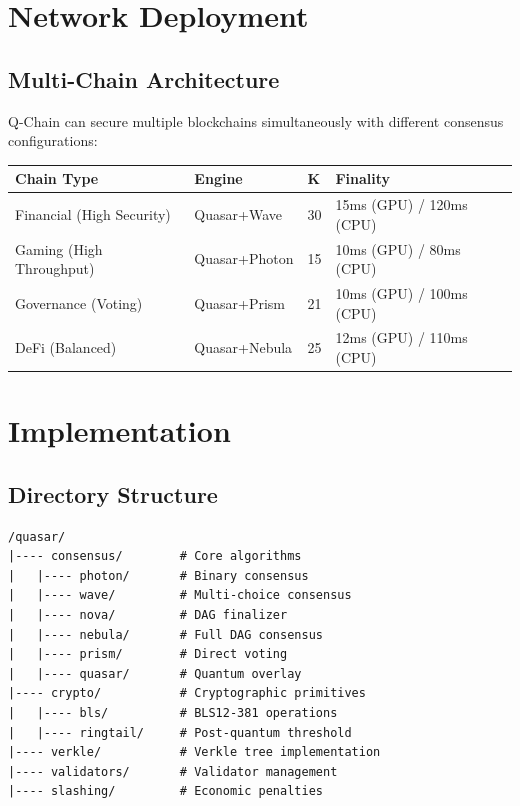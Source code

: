 \documentclass[11pt]{article}
\begin{document}
\section{Network Deployment}

\subsection{Multi-Chain Architecture}

Q-Chain can secure multiple blockchains simultaneously with different consensus configurations:

\begin{table}[h]
\centering
\small
\begin{tabular}{@{}llll@{}}
\toprule
\textbf{Chain Type} & \textbf{Engine} & \textbf{K} & \textbf{Finality} \\
\midrule
Financial (High Security) & Quasar+Wave & 30 & 15ms (GPU) / 120ms (CPU) \\
Gaming (High Throughput) & Quasar+Photon & 15 & 10ms (GPU) / 80ms (CPU) \\
Governance (Voting) & Quasar+Prism & 21 & 10ms (GPU) / 100ms (CPU) \\
DeFi (Balanced) & Quasar+Nebula & 25 & 12ms (GPU) / 110ms (CPU) \\
\bottomrule
\end{tabular}

\label{tab:configurations}
\end{table}

\section{Implementation}

\subsection{Directory Structure}

\begin{verbatim}
/quasar/
|---- consensus/        # Core algorithms
|   |---- photon/       # Binary consensus
|   |---- wave/         # Multi-choice consensus
|   |---- nova/         # DAG finalizer
|   |---- nebula/       # Full DAG consensus
|   |---- prism/        # Direct voting
|   |---- quasar/       # Quantum overlay
|---- crypto/           # Cryptographic primitives
|   |---- bls/          # BLS12-381 operations
|   |---- ringtail/     # Post-quantum threshold
|---- verkle/           # Verkle tree implementation
|---- validators/       # Validator management
|---- slashing/         # Economic penalties
\end{verbatim}
\end{document}

